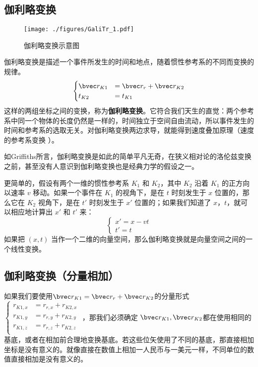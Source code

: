 

\subsection{伽利略变换}
\begin{figure}[ht]
\centering
\texttt{[image: ./figures/GaliTr\_1.pdf]}
\caption{伽利略变换示意图} \label{GaliTr_fig1}
\end{figure}

伽利略变换是描述一个事件所发生的时间和地点，随着惯性参考系的不同而变换的规律。
\begin{equation}
\begin{cases}
\bvec r_{K1} &= \bvec r_{r}+\bvec r_{K2}\\
t_{K2}&=t_{K1}
\end{cases}
\end{equation}
这样的两组坐标之间的变换，称为\textbf{伽利略变换}。它符合我们天生的直觉：两个参考系中同一个物体的长度仍然是一样的，时间独立于空间自由流动，所以事件发生的时间和参考系的选取无关。对伽利略变换两边求导，就能得到速度叠加原理（速度的参考系变换 ）。

如Griffiths所言，伽利略变换是如此的简单平凡无奇，在狭义相对论的洛伦兹变换之前，甚至没有人意识到伽利略变换也是经典力学的假设之一。

更简单的，假设有两个一维的惯性参考系 $K_1$ 和 $K_2$，其中 $K_2$ 沿着 $K_1$ 的正方向以速率 $v$ 移动。如果一个事件在 $K_1$ 的视角下，是在 $t$ 时刻发生于 $x$ 位置的，那么它在 $K_2$ 视角下，是在 $t'$ 时刻发生于 $x'$ 位置的；如果我们知道了 $x$，$t$，就可以相应地计算出 $x'$ 和 $t'$ 来：
\begin{equation}
\begin{cases}
x' = x - vt\\
t' = t
\end{cases}
\end{equation}
如果把 $(x, t)$ 当作一个二维的向量空间，那么伽利略变换就是向量空间之间的一个线性变换。

\subsection{伽利略变换（分量相加）}
如果我们要使用$\bvec r_{K1} = \bvec r_{r}+\bvec r_{K2}$的分量形式 
$
\begin{cases}
r_{K1,x}&=r_{r,x}+r_{K2,x}\\
r_{K1,y}&=r_{r,y}+r_{K2,y}\\
r_{K1,z}&=r_{r,z}+r_{K2,z}\\
\end{cases}
$
，那我们必须确定 $\bvec r_{K1}, \bvec r_{K2}$都在使用相同的基底，或者在相加前合理地变换基底。若这些位矢使用了不同的基底，那直接相加坐标是没有意义的。就像直接在数值上相加一人民币与一美元一样，不同单位的数值直接相加是没有意义的。
